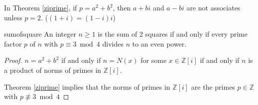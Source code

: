 \begin{remark}
    In Theorem \eqref{ziprime}, if \(p = a^2 + b^2\), then \(a + bi\) and \(a - bi\) are not associates unless \(p = 2\). (\((1 + i) = (1-i)i\))
\end{remark}
\begin{corollary}{}{sumofsquare}
    An integer \(n \geq 1\) is the sum of 2 squares if and only if every prime factor \(p\) of \(n\) with \(p \equiv 3 \bmod 4\) divides \(n\) to an even power.
\end{corollary}
\begin{proof}
    \(n = a^2 + b^2\) if and only if \(n = N(x)\) for some \(x \in \mathbb{Z}[i]\) if and only if \(n\) is a product of norms of primes in \(\mathbb{Z}[i]\).

    Theorem \eqref{ziprime} implies that the norms of primes in \(\mathbb{Z}[i]\) are the primes \(p \in \mathbb{Z}\) with \(p \not \equiv 3 \bmod 4\)
\end{proof}